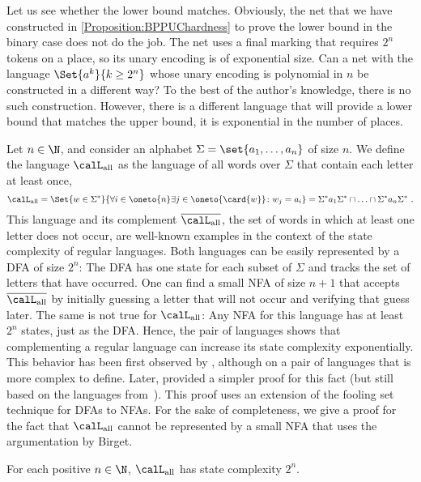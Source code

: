 \documentclass[../../diss.tex]{subfiles}
\begin{document}
Let us see whether the lower bound matches.
Obviously, the net that we have constructed in \cref{Proposition:BPPUChardness} to prove the lower bound in the binary case does not do the job.
The net uses a final marking that requires $2^n$ tokens on a place, so its unary encoding is of exponential size.
Can a net with the language $\Set{a^k}{k \geq 2^n}$ whose unary encoding is polynomial in $n$ be constructed in a different way?
To the best of the author's knowledge, there is no such construction.
However, there is a different language that will provide a lower bound that matches the upper bound, \ie it is exponential in the number of places.

Let $n \in \N$, and consider an alphabet $\Sigma = \set{a_1, \ldots, a_n}$ of size $n$.
We define the language $\calL_{\text{all}}$ as the language of all words over $\Sigma$ that contain each letter at least once,
\[
    \calL_{\text{all}} = \Set{ w \in \Sigma^*}{ \forall i \in \oneto{n} \exists j \in \oneto{\card{w}} \colon w_j = a_i } = \Sigma^*a_1\Sigma^* \cap \ldots \cap \Sigma^* a_n \Sigma^*
    \ .
\]
This language and its complement $\overline{\calL_{\text{all}}}$, the set of words in which at least one letter does not occur, are well-known examples in the context of the state complexity of regular languages.
Both languages can be easily represented by a DFA of size $2^n$: The DFA has one state for each subset of $\Sigma$ and tracks the set of letters that have occurred.
One can find a small NFA of size $n+1$ that accepts $\overline{\calL_{\text{all}}}$ by initially guessing a letter that will not occur and verifying that guess later.
The same is not true for $\calL_{\text{all}}$: Any NFA for this language has at least $2^n$ states, just as the DFA.\@
Hence, the pair of languages shows that complementing a regular language can increase its state complexity exponentially.
This behavior has been first observed by , although on a pair of languages that is more complex to define.
Later,  provided a simpler proof for this fact (but still based on the languages from~\cite{SakodaS78}).
This proof uses an extension of the fooling set technique for DFAs to NFAs.
For the sake of completeness, we give a proof for the fact that $\calL_{\text{all}}$ cannot be represented by a small NFA that uses the argumentation by Birget.

\begin{lemma}
    For each positive $n \in \N$, $\calL_{\text{all}}$ has state complexity $2^n$.
\end{lemma}
\end{document}
